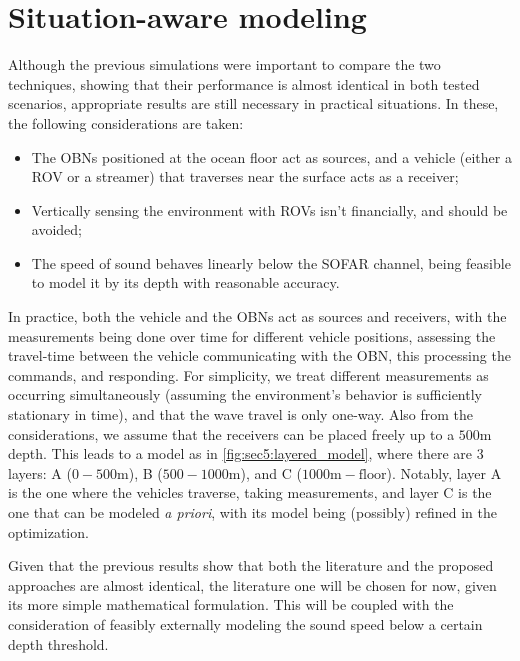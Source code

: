 \section{Situation-aware modeling}



Although the previous simulations were important to compare the two techniques, showing that their performance is almost identical in both tested scenarios, appropriate results are still necessary in practical situations. In these, the following considerations are taken:
\begin{itemize}
	\item The OBNs positioned at the ocean floor act as sources, and a vehicle (either a ROV or a streamer) that traverses near the surface acts as a receiver;
	\item Vertically sensing the environment with ROVs isn't financially, and should be avoided;
	\item The speed of sound behaves linearly below the SOFAR channel, being feasible to model it by its depth with reasonable accuracy.
\end{itemize}



In practice, both the vehicle and the OBNs act as sources and receivers, with the measurements being done over time for different vehicle positions, assessing the travel-time between the vehicle communicating with the OBN, this processing the commands, and responding. For simplicity, we treat different measurements as occurring simultaneously (assuming the environment's behavior is sufficiently stationary in time), and that the wave travel is only one-way. Also from the considerations, we assume that the receivers can be placed freely up to a $500\si{\meter}$ depth. This leads to a model as in \cref{fig:sec5:layered_model}, where there are 3 layers: A ($0-500\si{\meter}$), B ($500-1000\si{\meter}$), and C ($1000\si{\meter}-\text{floor}$). Notably, layer A is the one where the vehicles traverse, taking measurements, and layer C is the one that can be modeled \textit{a priori}, with its model being (possibly) refined in the optimization.

Given that the previous results show that both the literature and the proposed approaches are almost identical, the literature one will be chosen for now, given its more simple mathematical formulation. This will be coupled with the consideration of feasibly externally modeling the sound speed below a certain depth threshold.

